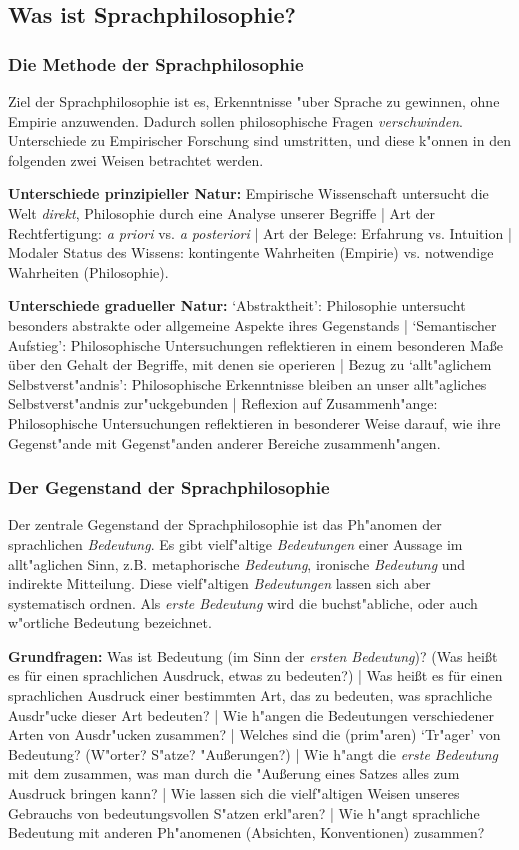 \documentclass[]{scrartcl}
\begin{document}
\subsection{Was ist Sprachphilosophie?}
\subsubsection{Die Methode der Sprachphilosophie}

Ziel der Sprachphilosophie ist es, Erkenntnisse "uber Sprache zu gewinnen, ohne Empirie anzuwenden. Dadurch sollen philosophische Fragen \emph{verschwinden}. Unterschiede zu Empirischer Forschung sind umstritten, und diese k"onnen in den folgenden zwei Weisen betrachtet werden.

\textbf{Unterschiede prinzipieller Natur:} Empirische Wissenschaft untersucht die Welt \emph{direkt}, Philosophie durch eine Analyse unserer Begriffe | Art der Rechtfertigung: \emph{a priori} vs. \emph{a posteriori} | Art der Belege: Erfahrung vs. Intuition | Modaler Status des Wissens: kontingente Wahrheiten (Empirie) vs. notwendige Wahrheiten (Philosophie).

\textbf{Unterschiede gradueller Natur:} `Abstraktheit': Philosophie untersucht besonders abstrakte oder allgemeine Aspekte ihres Gegenstands | `Semantischer Aufstieg': Philosophische Untersuchungen reflektieren in einem besonderen Ma\ss e über den Gehalt der Begriffe, mit denen sie operieren | Bezug zu `allt"aglichem Selbstverst"andnis': Philosophische Erkenntnisse bleiben an unser allt"agliches
Selbstverst"andnis zur"uckgebunden | Reflexion auf Zusammenh"ange: Philosophische Untersuchungen reflektieren in besonderer Weise darauf, wie ihre Gegenst"ande mit Gegenst"anden anderer Bereiche zusammenh"angen.


\subsubsection{Der Gegenstand der Sprachphilosophie}

Der zentrale Gegenstand der Sprachphilosophie ist das Ph"anomen der sprachlichen \emph{Bedeutung}. Es gibt vielf"altige \emph{Bedeutungen} einer Aussage im allt"aglichen Sinn, z.B. metaphorische \emph{Bedeutung}, ironische \emph{Bedeutung} und indirekte Mitteilung. Diese vielf"altigen \emph{Bedeutungen} lassen sich aber systematisch ordnen. Als \emph{erste Bedeutung} wird die buchst"abliche, oder auch w"ortliche Bedeutung bezeichnet.

\textbf{Grundfragen:} Was ist Bedeutung (im Sinn der \emph{ersten Bedeutung})? (Was hei\ss t es für einen sprachlichen Ausdruck, etwas zu bedeuten?) | Was heißt es für einen sprachlichen Ausdruck einer bestimmten Art, das zu bedeuten, was sprachliche Ausdr"ucke dieser Art bedeuten? | Wie h"angen die Bedeutungen verschiedener Arten von Ausdr"ucken zusammen? | Welches sind die (prim"aren) `Tr"ager' von Bedeutung? (W"orter? S"atze? "Au\ss erungen?) | Wie h"angt die \emph{erste Bedeutung} mit dem zusammen, was man durch die "Au\ss erung eines Satzes alles zum Ausdruck bringen kann? | Wie lassen sich die vielf"altigen Weisen unseres Gebrauchs von bedeutungsvollen S"atzen erkl"aren? | Wie h"angt sprachliche Bedeutung mit anderen Ph"anomenen (Absichten, Konventionen) zusammen?
\end{document}
